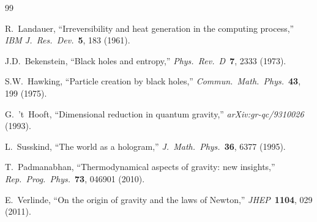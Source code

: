 \documentclass[11pt,a4paper]{article}
\theoremstyle{definition}
\begin{document}
\begin{thebibliography}{99}

R.~Landauer, ``Irreversibility and heat generation in the computing process,'' \textit{IBM J.\ Res.\ Dev.}\ \textbf{5}, 183 (1961).

J.D.~Bekenstein, ``Black holes and entropy,'' \textit{Phys.\ Rev.\ D}\ \textbf{7}, 2333 (1973).

S.W.~Hawking, ``Particle creation by black holes,'' \textit{Commun.\ Math.\ Phys.}\ \textbf{43}, 199 (1975).

G.~'t~Hooft, ``Dimensional reduction in quantum gravity,'' \textit{arXiv:gr-qc/9310026} (1993).

L.~Susskind, ``The world as a hologram,'' \textit{J.\ Math.\ Phys.}\ \textbf{36}, 6377 (1995).

T.~Padmanabhan, ``Thermodynamical aspects of gravity: new insights,'' \textit{Rep.\ Prog.\ Phys.}\ \textbf{73}, 046901 (2010).

E.~Verlinde, ``On the origin of gravity and the laws of Newton,'' \textit{JHEP}\ \textbf{1104}, 029 (2011).

\end{thebibliography}
\end{document}
